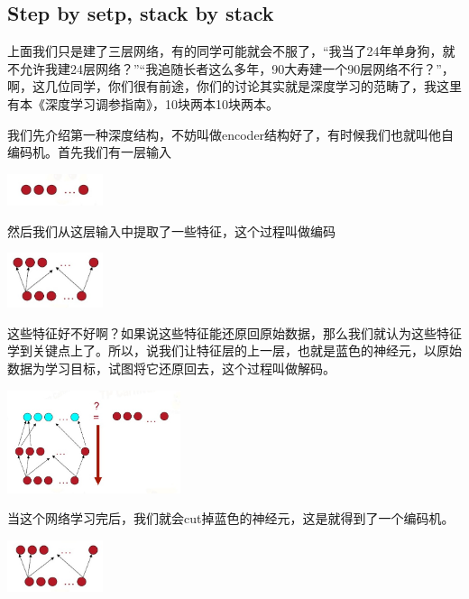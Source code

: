 \documentclass{article}
\begin{document}
\subsection{Step by setp, stack by stack}
上面我们只是建了三层网络，有的同学可能就会不服了，“我当了24年单身狗，就不允许我建24层网络？”“我追随长者这么多年，90大寿建一个90层网络不行？”，啊，这几位同学，你们很有前途，你们的讨论其实就是深度学习的范畴了，我这里有本《深度学习调参指南》，10块两本10块两本。

我们先介绍第一种深度结构，不妨叫做encoder结构好了，有时候我们也就叫他自编码机。首先我们有一层输入

\begin{center}
\includegraphics[width=1.1in]{image/image12.jpg}
\end{center}

然后我们从这层输入中提取了一些特征，这个过程叫做编码

\begin{center}
\includegraphics[width=1.1in]{image/image13.jpg}
\end{center}

这些特征好不好啊？如果说这些特征能还原回原始数据，那么我们就认为这些特征学到关键点上了。所以，说我们让特征层的上一层，也就是蓝色的神经元，以原始数据为学习目标，试图将它还原回去，这个过程叫做解码。

\begin{center}
\includegraphics[width=2in]{image/image14.jpg}
\end{center}

当这个网络学习完后，我们就会cut掉蓝色的神经元，这是就得到了一个编码机。

\begin{center}
\includegraphics[width=1.1in]{image/image15.jpg}
\end{center}
\end{document}
